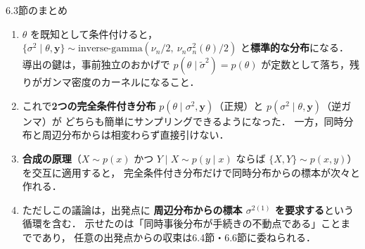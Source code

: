 \documentclass[lualatex,ja=standard,a4paper,12pt]{bxjsarticle}
\begin{document}
\begin{thmbox}{6.3節のまとめ}
\begin{enumerate}
  \item $\theta$ を既知として条件付けると，
        $\{\sigma^2 \mid \theta, \boldsymbol{y}\} \sim
        \mathrm{inverse\text{-}gamma}(\nu_n/2,\ \nu_n\sigma_n^2(\theta)/2)$
        と\textbf{標準的な分布}になる．
        導出の鍵は，事前独立のおかげで $p(\theta \mid \tilde{\sigma}^2) = p(\theta)$
        が定数として落ち，残りがガンマ密度のカーネルになること．

  \item これで\textbf{2つの完全条件付き分布}
        $p(\theta \mid \sigma^2, \boldsymbol{y})$（正規）と
        $p(\sigma^2 \mid \theta, \boldsymbol{y})$（逆ガンマ）が
        どちらも簡単にサンプリングできるようになった．
        一方，同時分布と周辺分布からは相変わらず直接引けない．

  \item \textbf{合成の原理}（$X \sim p(x)$ かつ $Y \mid X \sim p(y \mid x)$
        ならば $\{X,Y\} \sim p(x,y)$）を交互に適用すると，
        完全条件付き分布だけで同時分布からの標本が次々と作れる．

  \item ただしこの議論は，出発点に
        \textbf{周辺分布からの標本 $\sigma^{2(1)}$ を要求する}という循環を含む．
        示せたのは「同時事後分布が手続きの不動点である」ことまでであり，
        任意の出発点からの収束は6.4節・6.6節に委ねられる．
\end{enumerate}
\end{thmbox}
\end{document}
